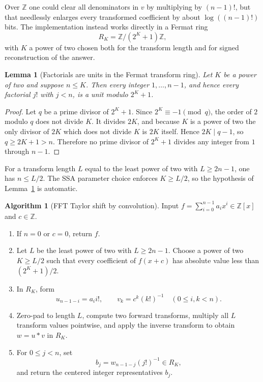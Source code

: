 \documentclass[11pt]{book}
\newtheorem{lemma}[theorem]{Lemma}
\theoremstyle{definition}
\newtheorem{algorithm}[theorem]{Algorithm}
\newcommand{\ZZ}{\mathbb Z}
\begin{document}
Over $\ZZ$ one could clear all denominators in $v$ by multiplying by
$(n-1)!$, but that needlessly enlarges every transformed coefficient by about
$\log((n-1)!)$ bits.  The implementation instead works directly in a Fermat
ring
\[
 R_K=\ZZ/(2^K+1)\ZZ,
\]
with $K$ a power of two chosen both for the transform length and for signed
reconstruction of the answer.

\begin{lemma}[Factorials are units in the Fermat transform ring]
\label{lem:taylor-factorial-units}
Let $K$ be a power of two and suppose $n\leq K$.  Then every integer
$1,\ldots,n-1$, and hence every factorial $j!$ with $j<n$, is a unit modulo
$2^K+1$.
\end{lemma}

\begin{proof}
Let $q$ be a prime divisor of $2^K+1$.  Since $2^K\equiv-1\pmod q$, the order
of $2$ modulo $q$ does not divide $K$.  It divides $2K$, and because $K$ is a
power of two the only divisor of $2K$ which does not divide $K$ is $2K$
itself.  Hence $2K\mid q-1$, so $q\geq2K+1>n$.  Therefore no prime divisor of
$2^K+1$ divides any integer from $1$ through $n-1$.
\end{proof}

For a transform length $L$ equal to the least power of two with
$L\geq2n-1$, one has $n\leq L/2$.  The SSA parameter choice enforces
$K\geq L/2$, so the hypothesis of Lemma~\ref{lem:taylor-factorial-units} is
automatic.

\begin{algorithm}[FFT Taylor shift by convolution]
\label{alg:fft-taylor-shift}
Input $f=\sum_{i=0}^{n-1}a_ix^i\in\ZZ[x]$ and $c\in\ZZ$.
\begin{enumerate}
 \item If $n=0$ or $c=0$, return $f$.
 \item Let $L$ be the least power of two with $L\geq2n-1$.
 Choose a power of two $K\geq L/2$ such that every coefficient of
 $f(x+c)$ has absolute value less than $(2^K+1)/2$.
 \item In $R_K$, form
 \[
   u_{n-1-i}=a_i i!,\qquad v_k=c^k(k!)^{-1}
   \quad(0\leq i,k<n).
 \]
 \item Zero-pad to length $L$, compute two forward transforms, multiply all
 $L$ transform values pointwise, and apply the inverse transform to obtain
 $w=u*v$ in $R_K$.
 \item For $0\leq j<n$, set
 \[
   b_j=w_{n-1-j}(j!)^{-1}\in R_K,
 \]
 and return the centered integer representatives $b_j$.
\end{enumerate}
\end{algorithm}
\end{document}
